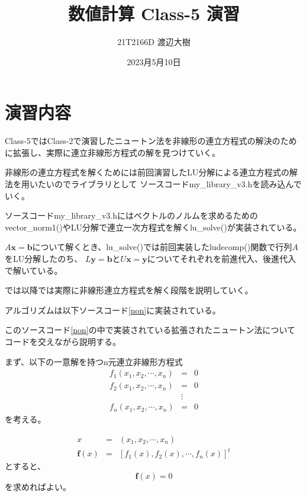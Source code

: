 \documentclass[a4paper,11pt]{jsarticle}
\begin{document}

\title{数値計算 Class-5 演習}
\author{21T2166D 渡辺大樹}
\date{2023月5月10日}
\maketitle

\section{演習内容}
Class-5ではClass-2で演習したニュートン法を非線形の連立方程式の解決のために拡張し、実際に連立非線形方程式の解を見つけていく。

非線形の連立方程式を解くためには前回演習したLU分解による連立方程式の解法を用いたいのでライブラリとして
ソースコードmy\_library\_v3.hを読み込んでいく。

ソースコードmy\_library\_v3.hにはベクトルのノルムを求めるためのvector\_norm1()やLU分解で連立一次方程式を解くlu\_solve()が実装されている。

$A\textbf{x}=\textbf{b}$について解くとき、lu\_solve()では前回実装したludecomp()関数で行列$A$をLU分解したのち、
$L\textbf{y}=\textbf{b}$と$U\textbf{x}=\textbf{y}$についてそれぞれを前進代入、後進代入で解いている。

では以降では実際に非線形連立方程式を解く段階を説明していく。

アルゴリズムは以下ソースコード\ref{non}に実装されている。


\newpage
このソースコード\ref{non}の中で実装されている拡張されたニュートン法についてコードを交えながら説明する。

まず、以下の一意解を持つn元連立非線形方程式
\begin{displaymath}
    \begin{array}{lll}
        f_1(x_1,x_2,\cdots,x_n) & =      & 0 \\
        f_2(x_1,x_2,\cdots,x_n) & =      & 0 \\
                                & \vdots &   \\
        f_n(x_1,x_2,\cdots,x_n) & =      & 0
    \end{array}
\end{displaymath}
を考える。

\begin{displaymath}
    \begin{array}{lll}
        x             & = & (x_1,x_2,\cdots,x_n)               \\
        \textbf{f}(x) & = & [f_1(x), f_2(x), \cdots, f_n(x)]^t
    \end{array}
\end{displaymath}
とすると、
\begin{displaymath}
    \textbf{f}(x) = 0
\end{displaymath}
を求めればよい。
\end{document}
